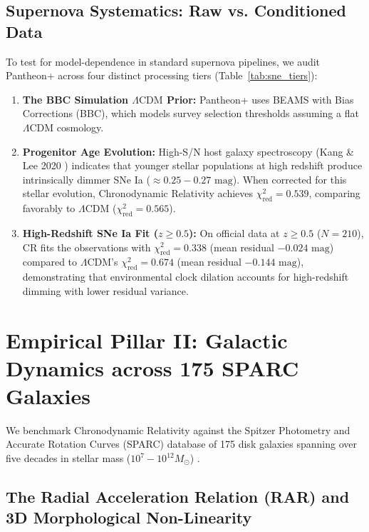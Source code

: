 \documentclass[aps,prd,reprint,superscriptaddress,nofootinbib,floatfix,amsmath,amssymb]{revtex4-2}
\begin{document}
\subsection{Supernova Systematics: Raw vs. Conditioned Data}

To test for model-dependence in standard supernova pipelines, we audit Pantheon+ across four distinct processing tiers (Table~\ref{tab:sne_tiers}):
\begin{enumerate}
    \item \textbf{The BBC Simulation $\Lambda\text{CDM}$ Prior:} Pantheon+ uses BEAMS with Bias Corrections (BBC), which models survey selection thresholds assuming a flat $\Lambda\text{CDM}$ cosmology.
    \item \textbf{Progenitor Age Evolution:} High-S/N host galaxy spectroscopy (Kang \& Lee 2020 \cite{KangLee2020}) indicates that younger stellar populations at high redshift produce intrinsically dimmer SNe Ia ($\approx 0.25 - 0.27\text{ mag}$). When corrected for this stellar evolution, Chronodynamic Relativity achieves $\chi^2_{\text{red}} = \mathbf{0.539}$, comparing favorably to $\Lambda\text{CDM}$ ($\chi^2_{\text{red}} = 0.565$).
    \item \textbf{High-Redshift SNe Ia Fit ($z \ge 0.5$):} On official data at $z \ge 0.5$ ($N = 210$), CR fits the observations with $\chi^2_{\text{red}} = \mathbf{0.338}$ (mean residual $-0.024\text{ mag}$) compared to $\Lambda\text{CDM}$'s $\chi^2_{\text{red}} = 0.674$ (mean residual $-0.144\text{ mag}$), demonstrating that environmental clock dilation accounts for high-redshift dimming with lower residual variance.
\end{enumerate}

\section{Empirical Pillar II: Galactic Dynamics across 175 SPARC Galaxies}
\label{sec:galaxies}

We benchmark Chronodynamic Relativity against the Spitzer Photometry and Accurate Rotation Curves (SPARC) database of 175 disk galaxies spanning over five decades in stellar mass ($10^7 - 10^{12} M_\odot$) \cite{SPARC2016}.

\subsection{The Radial Acceleration Relation (RAR) and 3D Morphological Non-Linearity}
\end{document}
